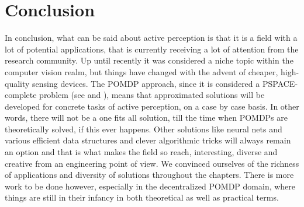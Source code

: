 \documentclass[a4paper,11pt,english]{article}
\begin{document}
\section{Conclusion}
In conclusion, what can be said about active perception is that it is a field with a lot of potential applications, that is currently receiving a lot of attention from the research community. Up until recently it was considered a niche topic within the computer vision realm, but things have changed with the advent of cheaper, high-quality sensing devices. The POMDP approach, since it is considered a PSPACE-complete problem (see \cite{papadimitriou1987complexity} and \cite{arora2009computational}), means that approximated solutions will be developed for concrete tasks of active perception, on a case by case basis. In other words, there will not be a one fits all solution, till the time when POMDPs are theoretically solved, if this ever happens. Other solutions like neural nets and various efficient data structures and clever algorithmic tricks will always remain an option and that is what makes the field so reach, interesting, diverse and creative from an engineering point of view. We convinced ourselves of the richness of applications and diversity of solutions throughout the chapters. There is more work to be done however, especially in the decentralized POMDP domain, where things are still in their infancy in both theoretical as well as practical terms.

\newpage


\end{document}
